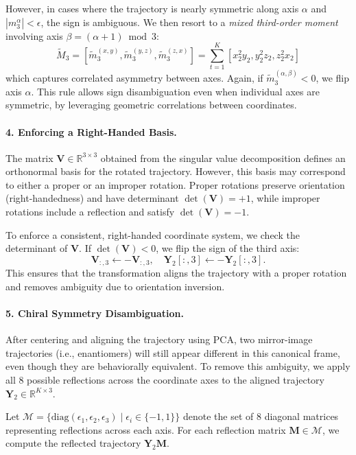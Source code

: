 However, in cases where the trajectory is nearly symmetric along axis $\alpha$ and $|m_3^{\alpha}| < \epsilon$, the sign is ambiguous. We then resort to a \emph{mixed third-order moment} involving axis $\beta = (\alpha + 1) \bmod 3$:
\[
\tilde{M}_3 = [\tilde{m}_3^{(x,y)},\tilde{m}_3^{(y,z)},\tilde{m}_3^{(z,x)}] = \sum_{t=1}^{K} [x_2^2 y_2, y_2^2 z_2, z_2^2 x_2]%
\]
which captures correlated asymmetry between axes. Again, if $\tilde{m}_3^{(\alpha,\beta)} < 0$, we flip axis $\alpha$. This rule allows sign disambiguation even when individual axes are symmetric, by leveraging geometric correlations between coordinates.

\paragraph{4. Enforcing a Right-Handed Basis.} 
The matrix $\mathbf{V} \in \mathbb{R}^{3 \times 3}$ obtained from the singular value decomposition defines an orthonormal basis for the rotated trajectory. However, this basis may correspond to either a proper or an improper rotation. Proper rotations preserve orientation (right-handedness) and have determinant $\det(\mathbf{V}) = +1$, while improper rotations include a reflection and satisfy $\det(\mathbf{V}) = -1$.

To enforce a consistent, right-handed coordinate system, we check the determinant of $\mathbf{V}$. If $\det(\mathbf{V}) < 0$, we flip the sign of the third axis:
\[
\mathbf{V}_{:,3} \leftarrow -\mathbf{V}_{:,3}, \quad \mathbf{Y}_2[:,3] \leftarrow -\mathbf{Y}_2[:,3].
\]
This ensures that the transformation aligns the trajectory with a proper rotation and removes ambiguity due to orientation inversion.

\paragraph{5. Chiral Symmetry Disambiguation.} 
After centering and aligning the trajectory using PCA, two mirror-image trajectories (i.e., enantiomers) will still appear different in this canonical frame, even though they are behaviorally equivalent. To remove this ambiguity, we apply all 8 possible reflections across the coordinate axes to the aligned trajectory $\mathbf{Y}_2 \in \mathbb{R}^{K \times 3}$.

Let $\mathcal{M} = \{ \text{diag}(\epsilon_1, \epsilon_2, \epsilon_3) \mid \epsilon_i \in \{-1, 1\} \}$ denote the set of $8$ diagonal matrices representing reflections across each axis. For each reflection matrix $\mathbf{M} \in \mathcal{M}$, we compute the reflected trajectory $\mathbf{Y}_2 \mathbf{M}$.

